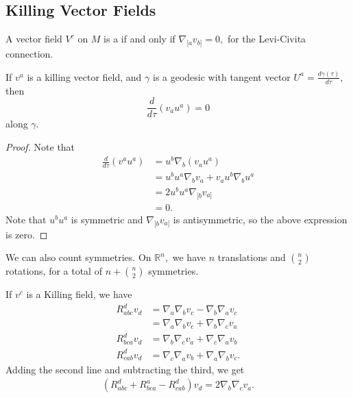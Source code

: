 \documentclass{article}
\numberwithin{equation}{section}
\begin{document}
\subsection{Killing Vector Fields}
\begin{definition}
    A vector field $V^c$ on $M$ is a  if and only if $\nabla_{[a}v_{b]}=0,$ for the Levi-Civita connection.
\end{definition}
\begin{lemma}
    If $v^a$ is a killing vector field, and $\gamma$ is a geodesic with tangent vector $U^a = \frac{d\gamma(\tau)}{d\tau},$ then 
    \begin{equation*}
        \frac{d}{d\tau}(v_au^a) = 0
    \end{equation*}
    along $\gamma.$
\end{lemma}
\begin{proof}
    Note that 
    \begin{align*}
        \frac{d}{d\tau}(v^au^a) &= u^b\nabla_b (v_au^a) \\ 
        &= u^bu^a\nabla_b v_a + v_a u^b\nabla_b u^a \\ 
        &= 2u^bu^a \nabla_{[b}v_{a]} \\ 
        &=0.
    \end{align*}
    Note that $u^bu^a$ is symmetric and $\nabla_{[b}v_{a]}$ is antisymmetric, so the above expression is zero.
\end{proof}
We can also count symmetries. On $\mathbb{R}^n,$ we have $n$ translations and $\binom{n}{2}$ rotations, for a total of $n+\binom{n}{2}$ symmetries.

If $v^c$ is a Killing field, we have 
\begin{align*}
    R_{abc}^{d}v_d &= \nabla_a\nabla_bv_c - \nabla_b\nabla_a v_c \\ 
    &= \nabla_a\nabla_bv_c + \nabla_b\nabla_cv_a \\ 
    R_{bca}^dv_d &= \nabla_b\nabla_cv_a + \nabla_c\nabla_av_b \\ 
    R_{cab}^dv_d &= \nabla_c\nabla_av_b + \nabla_a\nabla_b v_c.
\end{align*}
Adding the second line and subtracting the third, we get 
\begin{align*}
    (R_{abc}^d+R_{bca}^a-R_{cab}^d)v_d = 2\nabla_b\nabla_cv_a.
\end{align*}
\end{document}
